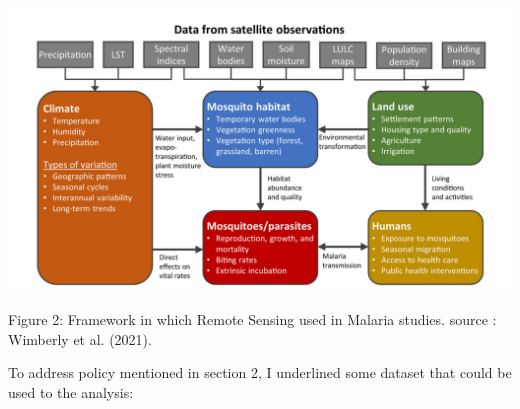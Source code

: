 \documentclass[
  letterpaper,
  DIV=11,
  numbers=noendperiod]{scrreprt}
\begin{document}
\includegraphics[width=7in,height=\textheight]{images/clipboard-687725868.png}

Figure 2: Framework in which Remote Sensing used in Malaria studies.
source : Wimberly et al. (2021).

To address policy mentioned in section 2, I underlined some dataset that
could be used to the analysis:
\end{document}
